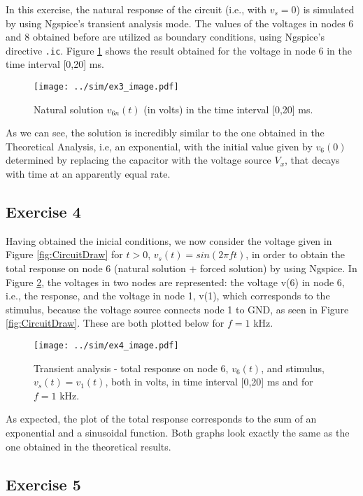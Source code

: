 In this exercise, the natural response of the circuit (i.e., with $v_s=0$) is simulated by using Ngspice's transient analysis mode. The values of the voltages in nodes 6 and 8 obtained before are utilized as boundary conditions, using Ngspice's directive \texttt{.ic}. Figure \ref{fig:Ex3_Image} shows the result obtained for the voltage in node 6 in the time interval [0,20] ms.

\begin{figure}[H]
  \centering
  \small
  \texttt{[image: ../sim/ex3\_image.pdf]}
  \caption{Natural solution $v_{6n}(t)$ (in volts) in the time interval [0,20] ms.}
  \label{fig:Ex3_Image}
\end{figure}

As we can see, the solution is incredibly similar to the one obtained in the Theoretical Analysis, i.e, an exponential, with the initial value given by $v_6(0)$ determined by replacing the capacitor with the voltage source $V_x$, that decays with time at an apparently equal rate.


\subsection{Exercise 4} \label{sec:Ex4Sim}

Having obtained the inicial conditions, we now consider the voltage given in Figure \ref{fig:CircuitDraw} for $t>0$, $v_s(t)=sin(2\pi ft)$, in order to obtain the total response on node 6 (natural solution + forced solution) by using Ngspice. In Figure \ref{fig:Ex4_Image}, the voltages in two nodes are represented: the voltage v(6) in node 6, i.e., the response, and the voltage in node 1, v(1), which corresponds to the stimulus, because the voltage source connects node 1 to GND, as seen in Figure \ref{fig:CircuitDraw}. These are both plotted below for $f=1$ kHz.

\begin{figure}[H]
  \centering
  \texttt{[image: ../sim/ex4\_image.pdf]}
  \caption{Transient analysis - total response on node 6, $v_6(t)$, and stimulus, $v_s(t)=v_1(t)$, both in volts, in time interval [0,20] ms and for $f=1$ kHz.}
  \label{fig:Ex4_Image}
\end{figure}


As expected, the plot of the total response corresponds to the sum of an exponential and a sinusoidal function. Both graphs look exactly the same as the one obtained in the theoretical results.

\subsection{Exercise 5} \label{sec:Ex5Sim}


